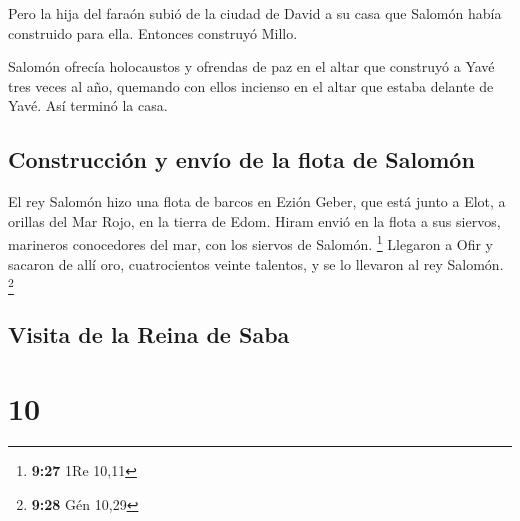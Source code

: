  Pero la hija del faraón subió de la ciudad de David a su
casa que Salomón había construido para ella. Entonces construyó Millo.

 Salomón ofrecía holocaustos y ofrendas de paz en el
altar que construyó a Yavé tres veces al año, quemando con ellos
incienso en el altar que estaba delante de Yavé. Así terminó la casa.

\hypertarget{construcciuxf3n-y-envuxedo-de-la-flota-de-salomuxf3n}{%
\subsection{Construcción y envío de la flota de
Salomón}\label{construcciuxf3n-y-envuxedo-de-la-flota-de-salomuxf3n}}

 El rey Salomón hizo una flota de barcos en Ezión Geber,
que está junto a Elot, a orillas del Mar Rojo, en la tierra de Edom.
 Hiram envió en la flota a sus siervos, marineros
conocedores del mar, con los siervos de Salomón. \footnote{\textbf{9:27}
  1Re 10,11}  Llegaron a Ofir y sacaron de allí oro,
cuatrocientos veinte talentos, y se lo llevaron al rey Salomón.
\footnote{\textbf{9:28} Gén 10,29}

\hypertarget{visita-de-la-reina-de-saba}{%
\subsection{Visita de la Reina de
Saba}\label{visita-de-la-reina-de-saba}}

\hypertarget{section-9}{%
\section{10}\label{section-9}}

